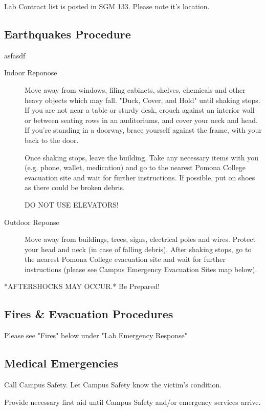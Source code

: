 \documentclass[12pt]{../SOP3_beta}
\begin{document}
\NP Lab Contract list is posted in SGM 133. Please note it's location.

\subsection*{Earthquakes Procedure} 

\NP asfasdf

\begin{description}
  \item[Indoor Reponose] Move away from windows, filing cabinets, shelves, chemicals and other heavy objects which may fall. "Duck, Cover, and Hold" until shaking stops. If you are not near a table or sturdy desk, crouch against an interior wall or between seating rows in an auditoriums, and cover your neck and head. If you’re standing in a doorway, brace yourself against the frame, with your back to the door.

Once shaking stops, leave the building. Take any necessary items with you (e.g. phone, wallet, medication) and go to the nearest Pomona College evacuation site and wait for further instructions. If possible, put on shoes as there could be broken debris. 

DO NOT USE ELEVATORS!

\item[Outdoor Reponse] Move away from buildings, trees, signs, electrical poles and wires.
Protect your head and neck (in case of falling debris).
After shaking stops, go to the nearest Pomona College evacuation site and wait for further instructions (please see Campus Emergency Evacuation Sites map below).

\end{description}
	
	*AFTERSHOCKS MAY OCCUR.* Be Prepared!


\subsection*{Fires \& Evacuation Procedures}

Please see "Fires" below under "Lab Emergency Response"

\subsection{Medical Emergencies}

\NP Call Campus Safety. Let Campus Safety know the victim's condition. 

\NP Provide necessary first aid until Campus Safety and/or emergency services arrive.
\end{document}
